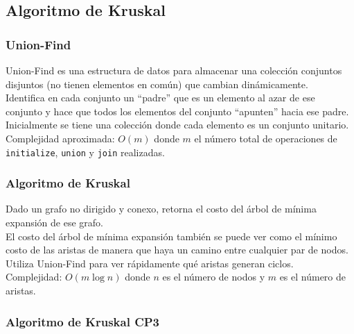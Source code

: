 \documentclass[10pt,letterpaper,twocolumn]{article}
\newcommand{\source}[1]{
  
  \dotfill
}
\begin{document}
  \subsection{Algoritmo de Kruskal}
    \subsubsection{Union-Find}
    Union-Find es una estructura de datos para almacenar una colección conjuntos disjuntos (no tienen elementos en común) que cambian dinámicamente.\\
    Identifica en cada conjunto un ``padre'' que es un elemento al azar de ese conjunto y hace que todos los elementos del conjunto ``apunten'' hacia ese padre. \\
    Inicialmente se tiene una colección donde cada elemento es un conjunto unitario.\\
    Complejidad aproximada: $O(m)$ donde $m$ el número total de operaciones de \verb|initialize|, \verb|union| y \verb|join| realizadas.\\
    \source{./src/union-find.cpp}

    \subsubsection{Algoritmo de Kruskal}
    Dado un grafo no dirigido y conexo, retorna el costo del árbol de mínima expansión de ese grafo.\\
    El costo del árbol de mínima expansión también se puede ver como el mínimo costo de las aristas de manera que haya un camino entre cualquier par de nodos.\\
    Utiliza Union-Find para ver rápidamente qué aristas generan ciclos.\\
    Complejidad: $O(m\operatorname{log} n)$ donde $n$ es el número de nodos y $m$ es el número de aristas.\\
    \source{./src/kruskal.cpp}
    
    \subsubsection{Algoritmo de Kruskal CP3}
    \source{./src/Kruskal-CP3.cpp}
\end{document}
